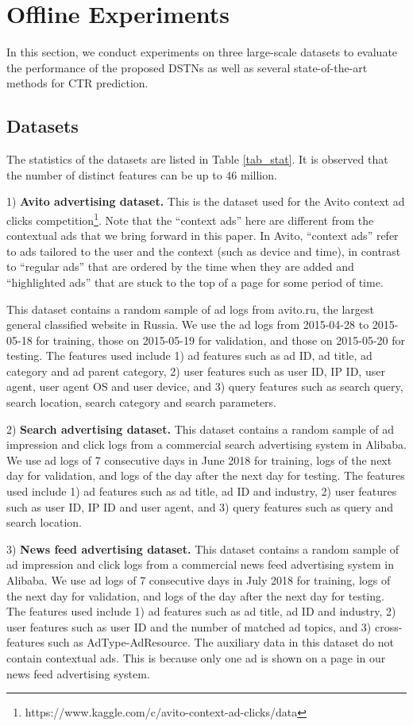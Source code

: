 \documentclass[sigconf]{acmart}
\begin{document}
\section{Offline Experiments}
In this section, we conduct experiments on three large-scale datasets to evaluate the performance of the proposed DSTNs as well as several state-of-the-art methods for CTR prediction.

\subsection{Datasets}
The statistics of the datasets are listed in Table \ref{tab_stat}. It is observed that the number of distinct features can be up to 46 million.

1) \textbf{Avito advertising dataset.}
This is the dataset used for the Avito context ad clicks competition\footnote{https://www.kaggle.com/c/avito-context-ad-clicks/data}. Note that the ``context ads'' here are different from the contextual ads that we bring forward in this paper.
In Avito, ``context ads'' refer to ads tailored to the user and the context (such as device and time), in contrast to ``regular ads'' that are ordered by the time when they are added and ``highlighted ads'' that are stuck to the top of a page for some period of time.

This dataset contains a random sample of ad logs from avito.ru, the largest general classified website in Russia.
We use the ad logs from 2015-04-28 to 2015-05-18 for training, those on 2015-05-19 for validation, and those on 2015-05-20 for testing.
The features used include 1) ad features such as ad ID, ad title, ad category and ad parent category, 2) user features such as user ID, IP ID, user agent, user agent OS and user device, and 3) query features such as search query, search location, search category and search parameters.

2) \textbf{Search advertising dataset.}
This dataset contains a random sample of ad impression and click logs from a commercial search advertising system in Alibaba. We use ad logs of 7 consecutive days in June 2018 for training, logs of the next day for validation, and logs of the day after the next day for testing.
The features used include 1) ad features such as ad title, ad ID and industry, 2) user features such as user ID, IP ID and user agent, and 3) query features such as query and search location.

3) \textbf{News feed advertising dataset.}
This dataset contains a random sample of ad impression and click logs from a commercial news feed advertising system in Alibaba.
We use ad logs of 7 consecutive days in July 2018 for training, logs of the next day for validation, and logs of the day after the next day for testing.
The features used include 1) ad features such as ad title, ad ID and industry, 2) user features such as user ID and the number of matched ad topics, and 3) cross-features such as AdType-AdResource.
The auxiliary data in this dataset do not contain contextual ads. This is because only one ad is shown on a page in our news feed advertising system.
\end{document}
